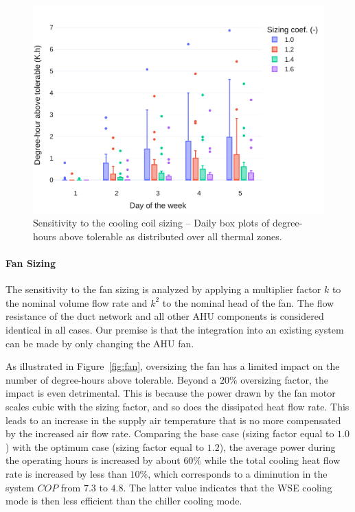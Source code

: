 \begin{figure}[!htbp]
\centering
\includegraphics[width=.7\linewidth]{../python_scripts/figures/CoilSizing.pdf}
\caption{Sensitivity to the cooling coil sizing -- Daily box plots of degree-hours above tolerable as distributed over all thermal zones.}
\label{fig:coil}
\end{figure}

\paragraph{Fan Sizing} \label{par:fan}

The sensitivity to the fan sizing is analyzed by applying a multiplier factor $k$ to the nominal volume flow rate and $k^2$ to the nominal head of the fan. The flow resistance of the duct network and all other AHU components is considered identical in all cases.
Our premise is that the integration into an existing system can be made by only changing the AHU fan.

As illustrated in Figure~\ref{fig:fan}, oversizing the fan has a limited impact on the number of degree-hours above tolerable. Beyond a $20\%$ oversizing factor, the impact is even detrimental. This is because the power drawn by the fan motor scales cubic with the sizing factor, and so does the dissipated heat flow rate. This leads to an increase in the supply air temperature that is no more compensated by the increased air flow rate.
Comparing the base case (sizing factor equal to $1.0$) with the optimum case (sizing factor equal to $1.2$), the average power during the operating hours is increased by about $60\%$ while the total cooling heat flow rate is increased by less than $10\%$, which corresponds to a diminution in the system $COP$ from $7.3$ to $4.8$. The latter value indicates that the WSE cooling mode is then less efficient than the chiller cooling mode.

